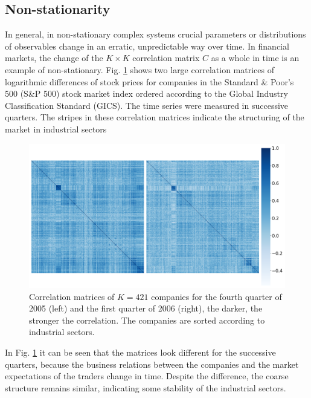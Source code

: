 \subsection{Non-stationarity}\label{subsec:non_stationarity}

In general, in non-stationary complex systems crucial parameters or
distributions of observables change in an erratic, unpredictable way over time.
In financial markets, the change of the $K \times K$ correlation matrix $C$ as
a whole in time is an example of non-stationary. Fig.
\ref{fig:correlation_matrices} shows two large correlation matrices of
logarithmic differences of stock prices for companies in the Standard \&
Poor's 500 (S\&P 500) stock market index ordered according to the Global
Industry Classification Standard (GICS). The time series were measured in
successive quarters. The stripes in these correlation matrices indicate the
structuring of the market in industrial sectors
\cite{state_crisis_7,non_stationarity_fin_guhr}

\begin{figure}[htbp]
    \centering
    \includegraphics[width=0.6\columnwidth]
    {figures/05_correlation_matrix.png}
    \caption{Correlation matrices of $K = 421$ companies for the fourth quarter
             of 2005 (left) and the first quarter of 2006 (right), the darker,
             the stronger the correlation. The companies are sorted according
             to industrial sectors.}
    \label{fig:correlation_matrices}
\end{figure}

In Fig. \ref{fig:correlation_matrices} it can be seen that the matrices look
different for the successive quarters, because the business relations between
the companies and the market expectations of the traders change in time.
Despite the difference, the coarse structure remains similar, indicating some
stability of the industrial sectors.

